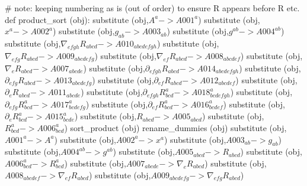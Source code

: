 \documentclass[12pt]{cdblatex}
\begin{document}
\begin{cadabra}
   # note: keeping numbering as is (out of order) to ensure R appears before \nabla R etc.
   def product_sort (obj):
       substitute (obj,$ A^{a}                             -> A001^{a}                  $)
       substitute (obj,$ x^{a}                             -> A002^{a}                  $)
       substitute (obj,$ g_{a b}                           -> A003_{a b}                $)
       substitute (obj,$ g^{a b}                           -> A004^{a b}                $)
       substitute (obj,$ \nabla_{e f g h}{R_{a b c d}}     -> A010_{a b c d e f g h}    $)
       substitute (obj,$ \nabla_{e f g}{R_{a b c d}}       -> A009_{a b c d e f g}      $)
       substitute (obj,$ \nabla_{e f}{R_{a b c d}}         -> A008_{a b c d e f}        $)
       substitute (obj,$ \nabla_{e}{R_{a b c d}}           -> A007_{a b c d e}          $)
       substitute (obj,$ \partial_{e f g h}{R_{a b c d}}   -> A014_{a b c d e f g h}    $)
       substitute (obj,$ \partial_{e f g}{R_{a b c d}}     -> A013_{a b c d e f g}      $)
       substitute (obj,$ \partial_{e f}{R_{a b c d}}       -> A012_{a b c d e f}        $)
       substitute (obj,$ \partial_{e}{R_{a b c d}}         -> A011_{a b c d e}          $)
       substitute (obj,$ \partial_{e f g h}{R^{a}_{b c d}} -> A018^{a}_{b c d e f g h}  $)
       substitute (obj,$ \partial_{e f g}{R^{a}_{b c d}}   -> A017^{a}_{b c d e f g}    $)
       substitute (obj,$ \partial_{e f}{R^{a}_{b c d}}     -> A016^{a}_{b c d e f}      $)
       substitute (obj,$ \partial_{e}{R^{a}_{b c d}}       -> A015^{a}_{b c d e}        $)
       substitute (obj,$ R_{a b c d}                       -> A005_{a b c d}            $)
       substitute (obj,$ R^{a}_{b c d}                     -> A006^{a}_{b c d}          $)
       sort_product   (obj)
       rename_dummies (obj)
       substitute (obj,$ A001^{a}                  -> A^{a}                             $)
       substitute (obj,$ A002^{a}                  -> x^{a}                             $)
       substitute (obj,$ A003_{a b}                -> g_{a b}                           $)
       substitute (obj,$ A004^{a b}                -> g^{a b}                           $)
       substitute (obj,$ A005_{a b c d}            -> R_{a b c d}                       $)
       substitute (obj,$ A006^{a}_{b c d}          -> R^{a}_{b c d}                     $)
       substitute (obj,$ A007_{a b c d e}          -> \nabla_{e}{R_{a b c d}}           $)
       substitute (obj,$ A008_{a b c d e f}        -> \nabla_{e f}{R_{a b c d}}         $)
       substitute (obj,$ A009_{a b c d e f g}      -> \nabla_{e f g}{R_{a b c d}}       $)

\end{cadabra}
\end{document}
